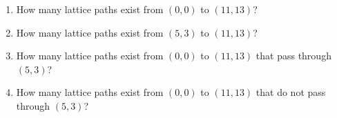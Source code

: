 \documentclass{article}
\begin{document}
\begin{enumerate}
\begin{enumerate}
    \item How many lattice paths exist from $(0,0)$ to $(11,13)$?
    \item How many lattice paths exist from $(5,3)$ to $(11,13)$?
    \item How many lattice paths exist from $(0,0)$ to $(11,13)$ that pass through $(5,3)$?
    \item How many lattice paths exist from $(0,0)$ to $(11,13)$ that do not pass through $(5,3)$?
\end{enumerate}

\end{enumerate}
\end{document}
